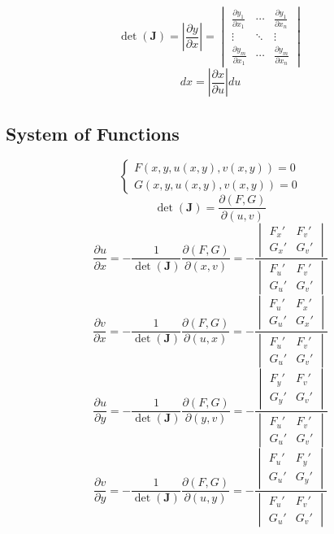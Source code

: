 \documentclass{article}
\begin{document}
\[
    \det(\mathbf{J}) = \left|\frac{\partial y}{\partial x}\right| = \begin{vmatrix}
                                                                        \frac{\partial y_1}{\partial x_1} & \cdots & \frac{\partial y_1}{\partial x_n} \\
                                                                        \vdots & \ddots & \vdots \\
                                                                        \frac{\partial y_m}{\partial x_1} & \cdots & \frac{\partial y_m}{\partial x_n}
    \end{vmatrix}
\]
\[
    dx = \left|\frac{\partial x}{\partial u}\right| du
\]

\subsection{System of Functions}

\[
    \begin{cases}
        F(x, y, u(x, y), v(x, y)) = 0 \\
        G(x, y, u(x, y), v(x, y)) = 0
    \end{cases}
\]
\[
    \det(\mathbf{J}) = \frac{\partial(F, G)}{\partial(u, v)}
\]
\[
    \frac{\partial u}{\partial x} = -\frac{1}{\det(\mathbf{J})} \frac{\partial(F, G)}{\partial(x, v)} = -\frac{\begin{vmatrix} F_x' & F_v' \\ G_x' & G_v' \end{vmatrix}}{\begin{vmatrix} F_u' & F_v' \\ G_u' & G_v' \end{vmatrix}}
\]
\[
    \frac{\partial v}{\partial x} = -\frac{1}{\det(\mathbf{J})} \frac{\partial(F, G)}{\partial(u, x)} = -\frac{\begin{vmatrix} F_u' & F_x' \\ G_u' & G_x' \end{vmatrix}}{\begin{vmatrix} F_u' & F_v' \\ G_u' & G_v' \end{vmatrix}}
\]
\[
    \frac{\partial u}{\partial y} = -\frac{1}{\det(\mathbf{J})} \frac{\partial(F, G)}{\partial(y, v)} = -\frac{\begin{vmatrix} F_y' & F_v' \\ G_y' & G_v' \end{vmatrix}}{\begin{vmatrix} F_u' & F_v' \\ G_u' & G_v' \end{vmatrix}}
\]
\[
    \frac{\partial v}{\partial y} = -\frac{1}{\det(\mathbf{J})} \frac{\partial(F, G)}{\partial(u, y)} = -\frac{\begin{vmatrix} F_u' & F_y' \\ G_u' & G_y' \end{vmatrix}}{\begin{vmatrix} F_u' & F_v' \\ G_u' & G_v' \end{vmatrix}}
\]
\end{document}
